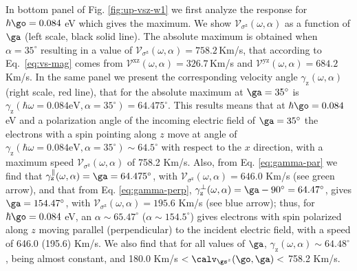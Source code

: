 \documentclass[prb,11pt,tightenlines,twocolumn,aps]{revtex4-1}
\begin{document}
In bottom panel of Fig. \ref{fig:up-vsz-w1} we first analyze the response for
$\hbar\go= 0.084$ eV which gives the maximum. We show
$\mathcal{V}_{\sigma^{\mathrm{z}}} (\omega,\alpha)$ as a function of $\ga$
(left scale, black solid line). The absolute maximum is obtained when $\alpha =
35^{\circ}$ resulting in a value of $\mathcal{V}_{\sigma^{\mathrm{z}}}
(\omega,\alpha) = 758.2$\,Km/s, that according to Eq.~\eqref{eq:vs-mag} comes
from $\mathcal{V}^{\mathrm{xz}}(\omega,\alpha) = 326.7$\,Km/s and
$\mathcal{V}^{\mathrm{yz}}(\omega,\alpha) = 684.2$\,Km/s.
% 
In the same panel we present the corresponding velocity angle
$\gamma_{\mathrm{z}}(\omega,\alpha)$ (right scale, red line), that for the
absolute maximum at $\ga = 35^\circ$ is $\gamma_{\mathrm{z}}(\hbar\omega =
0.084\text{eV},\alpha = 35^\circ) = 64.475^{\circ}$. This results means that at
$\hbar\go=0.084$ eV and a polarization angle of the incoming electric field of
$\ga = 35^\circ$ the electrons with a spin pointing along $z$ move at angle of
$\gamma_{\mathrm{z}}(\hbar\omega = 0.084\text{eV},\alpha=35^\circ) \sim
64.5^{\circ}$ with respect to the $x$ direction, with a  maximum speed
$\mathcal{V}_{\sigma^{\mathrm{z}}} (\omega,\alpha)$ of  758.2 Km/s. Also, from
Eq. \eqref{eq:gamma-par} we find that
$\gamma^\parallel_{\mathrm{z}}(\omega,\alpha)=\ga=64.475^\circ$, with
$\mathcal{V}_{\sigma^{\mathrm{z}}}(\omega,\alpha) = 646.0$ Km/s (see green
arrow), and that from Eq. \eqref{eq:gamma-perp},
$\gamma^\perp_{\mathrm{z}}(\omega,\alpha)=\ga-90^\circ=64.47^\circ$, gives
$\ga=154.47^\circ$, with $\mathcal{V}_{\sigma^{\mathrm{z}}}(\omega,\alpha) =
195.6$ Km/s (see blue arrow); thus, for $\hbar\go=0.084$ eV, an $\alpha \sim
65.47^\circ$ ($\alpha \sim 154.5^\circ$) gives electrons with spin polarized
along $z$ moving parallel (perpendicular) to the incident electric field,  with
a speed of 646.0 (195.6) Km/s.
% 
We also find that for all values of $\ga$, $\gamma_{\mathrm{z}}(\omega,\alpha)
\sim 64.48^{\circ}$, being almost constant, and 180.0 Km/s
$<\calv_{\gs^z}(\go,\ga)<$ 758.2 Km/s.
\end{document}

